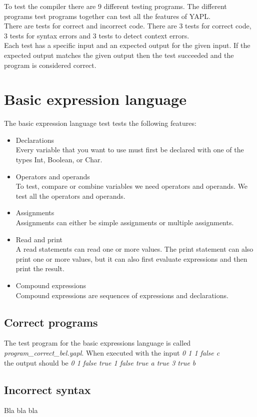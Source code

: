 To test the compiler there are 9 different testing programs. The different programs test programs together can test all the features of YAPL.\\
There are tests for correct and incorrect code. There are 3 tests for correct code, 3 tests for syntax errors and 3 tests to detect context errors.\\
Each test has a specific input and an expected output for the given input. If the expected output matches the given output then the test succeeded and the program is considered correct.

\section{Basic expression language}
The basic expression language test tests the following features:
\begin{itemize}
\item Declarations \\
	Every variable that you want to use must first be declared with one of the types Int, Boolean, or Char.
\item Operators and operands \\
	To test, compare or combine variables we need operators and operands. We test all the operators and operands.
\item Assignments \\
	Assignments can either be simple assignments or multiple assignments. 
\item Read and print \\
	A read statements can read one or more values. The print statement can also print one or more values, but it can also first evaluate expressions and then print the result.
\item Compound expressions \\
	Compound expressions are sequences of expressions and declarations. 
\end{itemize}
\subsection{Correct programs}
The test program for the basic expressions language is called \emph{program_correct_bel.yapl}. When executed with the input \emph{0 1 1 false c} \\the output should be \emph{0 1 false true 1 false true a true 3 true b}
\subsection{Incorrect syntax}
Bla bla bla

